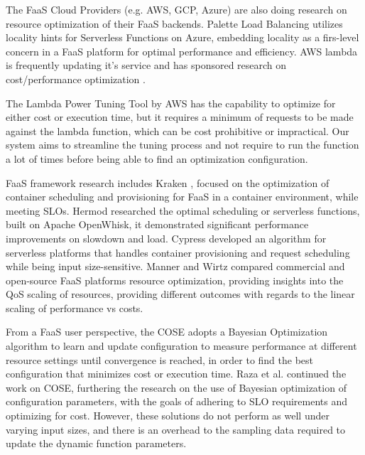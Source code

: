 \documentclass[conference]{IEEEtran}
\begin{document}
The FaaS Cloud Providers (e.g. AWS, GCP, Azure) are also doing research on resource optimization of their FaaS backends. Palette Load Balancing \cite{10.1145/3552326.3567496} utilizes locality hints for Serverless Functions on Azure, embedding locality as a firs-level concern in a FaaS platform for optimal performance and efficiency. AWS lambda is frequently updating it's service \cite{aws_new} and has sponsored research on cost/performance optimization \cite{aws_operating_lambda_performance_optimization}.

The Lambda Power Tuning Tool by AWS \cite{aws_lambda_power_tuning} has the capability to optimize for either cost or execution time, but it requires a minimum of requests to be made against the lambda function, which can be cost prohibitive or impractical. Our system aims to streamline the tuning process and not require to run the function a lot of times before being able to find an optimization configuration.

FaaS framework research includes Kraken \cite{10.1145/3472883.3486992}, focused on the optimization of container scheduling and provisioning for FaaS in a container environment, while meeting SLOs. Hermod \cite{10.1145/3542929.3563468} researched the optimal scheduling or serverless functions, built on Apache OpenWhisk, it demonstrated significant performance improvements on slowdown and load. Cypress \cite{10.1145/3542929.3563464} developed an algorithm for serverless platforms that handles container provisioning and request scheduling while being input size-sensitive. Manner and Wirtz \cite{9860370} compared commercial and open-source FaaS platforms resource optimization, providing insights into the QoS scaling of resources, providing different outcomes with regards to the linear scaling of performance vs costs.

From a FaaS user perspective, the COSE \cite{9155363} adopts a Bayesian Optimization algorithm to learn and update configuration to measure performance at different resource settings until convergence is reached, in order to find the best configuration that minimizes cost or execution time. Raza et al. \cite{10063937} continued the work on COSE, furthering the research on the use of Bayesian optimization of configuration parameters, with the goals of adhering to SLO requirements and optimizing for cost. However, these solutions do not perform as well under varying input sizes, and there is an overhead to the sampling data required to update the dynamic function parameters.
\end{document}
